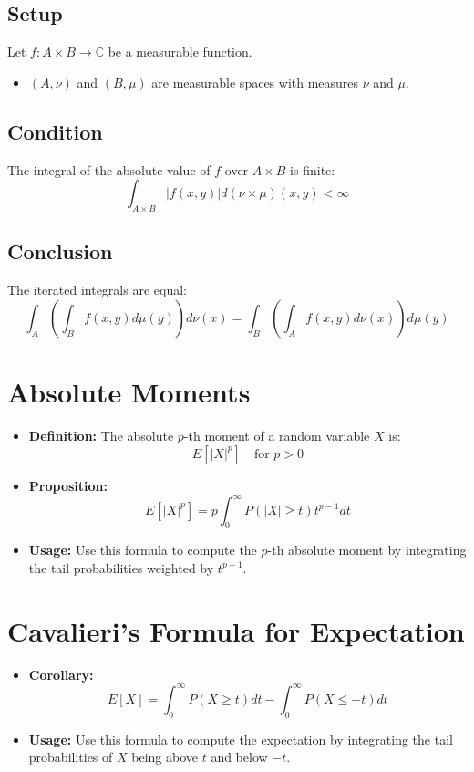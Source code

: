 \documentclass{article}
\begin{document}
\subsection*{Setup}
Let \( f : A \times B \to \mathbb{C} \) be a measurable function.
\begin{itemize}
    \item $(A, \nu)$ and $(B, \mu)$ are measurable spaces with measures $\nu$ and $\mu$.
\end{itemize}

\subsection*{Condition}
The integral of the absolute value of $f$ over $A \times B$ is finite:
\[
\int_{A \times B} |f(x, y)| d(\nu \times \mu)(x, y) < \infty
\]

\subsection*{Conclusion}
The iterated integrals are equal:
\[
\int_A \left( \int_B f(x, y) d\mu(y) \right) d\nu(x) = \int_B \left( \int_A f(x, y) d\nu(x) \right) d\mu(y)
\]


\section*{Absolute Moments}
\begin{itemize}
    \item \textbf{Definition:} The absolute $p$-th moment of a random variable $X$ is: 
    \[
    E[|X|^p] \quad \text{for } p > 0
    \]
    \item \textbf{Proposition:}
    \[
    E[|X|^p] = p \int_0^{\infty} P(|X| \ge t) t^{p-1} dt
    \]
    \item \textbf{Usage:} Use this formula to compute the $p$-th absolute moment by integrating the tail probabilities weighted by $t^{p-1}$.
\end{itemize}

\section*{Cavalieri's Formula for Expectation}
\begin{itemize}
    \item \textbf{Corollary:}
    \[
    E[X] = \int_0^{\infty} P(X \ge t) dt - \int_0^{\infty} P(X \le -t) dt
    \]
    \item \textbf{Usage:} Use this formula to compute the expectation by integrating the tail probabilities of $X$ being above $t$ and below $-t$.
\end{itemize}
\end{document}
